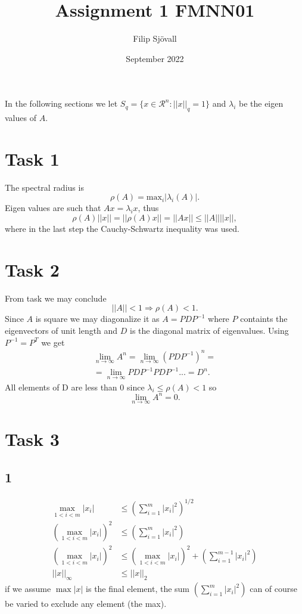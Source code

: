 \documentclass{article}
\title{Assignment 1 FMNN01}
\author{Filip Sjövall}
\date{September 2022}
\begin{document}
\maketitle
In the following sections we let $ S_q = \{ x \in \mathcal{R}^n : ||x||_q = 1    \} $ and $\lambda_i$ be the eigen values of $A$. 
\section*{Task 1}
The spectral radius is
\begin{equation}
    \rho(A) = \text{max}_i | \lambda_i(A) | .
\end{equation}
Eigen values are such that $Ax = \lambda_i x$, thus
\begin{equation}
    \rho(A)||x|| = ||\rho(A)x|| = ||Ax|| \leq ||A|| ||x||,
\end{equation}
where in the last step the Cauchy-Schwartz inequality was used.
\section*{Task 2}
From task we may conclude
\begin{equation}
    ||A|| < 1 \Rightarrow \rho(A) < 1.
\end{equation}
Since $A$ is square we may diagonalize it as $A = P D P ^{-1}$ where $P$ containts the eigenvectors of unit length and $D$ is the diagonal matrix of eigenvalues. Using $P^{-1} = P^T$ we get
\begin{align*}
    \lim_{n \to \infty} A^n = \lim_{n \to \infty} (PDP^{-1})^n = \\
    = \lim_{n \to \infty} PDP^{-1}PDP^{-1}... = D^n.
\end{align*}
All elements of D are less than 0 since $\lambda_i \leq \rho(A) < 1$ so 
\begin{equation}
    \lim_{n \to \infty} A^n = 0.
\end{equation}
\section*{Task 3}
\subsection*{1}
\begin{align*}
     \max_{1<i<m} |x_i| & \leq \left( \sum_{i=1}^m |x_i|^2 \right)^{1/2} \\
     (\max_{1<i<m} |x_i|)^2 & \leq  \left( \sum_{i=1}^m |x_i|^2 \right)  \\
     (\max_{1<i<m} |x_i|)^2 & \leq  (\max_{1<i<m} |x_i|)^2 + \left(  \sum_{i=1}^{m-1} |x_i|^2 \right) \\
     || x ||_\infty & \leq || x ||_2
\end{align*}
if we assume $\max |x|$ is the final element, the sum $ \left( \sum_{i=1}^m |x_i|^2 \right)$ can of course be varied to exclude any element (the max).
\end{document}
